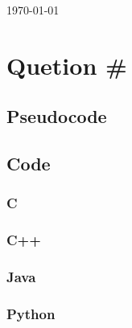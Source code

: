 \documentclass[11pt]{article}
\begin{document}
\begin{titlepage}
	\vfill\vfill\vfill 
	{\large\today} 

	\vfill 

\end{titlepage}


\tableofcontents
\newpage


\section{Quetion \#}

\subsection{Pseudocode}

\subsection{Code}
\subsubsection{C}
\subsubsection{C++}
\subsubsection{Java}
\subsubsection{Python}

\newpage
\end{document}
